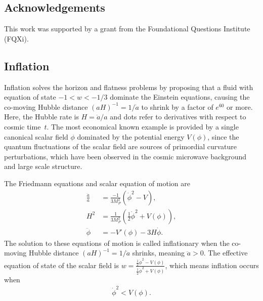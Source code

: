 \documentclass[aps,amsfonts,amsmath,prd,preprint,nofootinbib,superscriptaddress]{revtex4}
\newcommand{\MMp}{{M_P^2}}
\begin{document}
\subsection*{Acknowledgements}
This work was supported by a grant from the Foundational Questions Institute (FQXi).




\begin{appendix}



\section{Inflation}\label{sec:inflation}
Inflation solves the horizon and flatness problems \cite{guth} by proposing that a fluid with equation of state $-1< w < -1/3$ dominate the Einstein equations, 
causing the co-moving Hubble distance $(a H)^{-1} = 1/\dot a$ to shrink by a factor of $e^{60}$ or more. 
Here, the Hubble rate is $H = \dot a/a$ and dots refer to derivatives with respect to cosmic time~$t$.  
The most economical known example is provided by a single canonical scalar field $\phi$ dominated by the potential energy $V(\phi)$, 
since the quantum fluctuations of the scalar field are sources of primordial curvature perturbations, which have been observed 
in the cosmic microwave background and large scale structure\cite{mukhanov, steinhardt}.  

 
The Friedmann equations and scalar equation of motion are
\begin{align}
\frac{\ddot a}{a} &= \frac{-1}{3\MMp}\left(\dot\phi^2 - V  \right),\label{eq:addot}\\
H^2 &= \frac{1}{3\MMp}\left(\tfrac{1}{2}\dot\phi^2 + V(\phi)\right),\label{eq:adot}\\
\ddot \phi &= -V'(\phi) - 3 H \dot \phi.  \label{eq:scalareom}
\end{align}
The solution to these equations of motion is called inflationary when the co-moving Hubble distance $(a H)^{-1} = 1/\dot a$ shrinks, meaning $\ddot a > 0$. 
The effective equation of state of the scalar field is $w = \frac{\tfrac{1}{2}\dot\phi^2 - V(\phi)}{\tfrac{1}{2}\dot\phi^2 + V(\phi)}$, which means inflation occurs when
\begin{align}
\dot\phi^2 < V(\phi).
\end{align}





\end{appendix}
\end{document}
